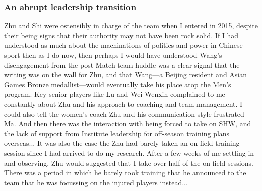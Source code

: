 \begin{CJK}{UTF8}{gbsn}



  \subsubsection{An abrupt leadership transition}
  Zhu and Shi were ostensibly in charge of the team when I entered in 2015, despite their being signs that their authority may not have been rock solid.  If I had understood as much about the machinations of politics and power in Chinese sport then as I do now, then perhaps I would have understood Wang's disengagement from the post-Match team huddle was a clear signal that the writing was on the wall for Zhu, and that Wang---a Beijing resident and Asian Games Bronze medallist---would eventually take his place atop the Men's program.  Key senior players like Lu and Wei Wenxin complained to me constantly about Zhu and his approach to coaching and team management.  I could also tell the women's coach Zhu and his communication style frustrated Ma.  And then there was the interaction with being forced to take on SHW, and the lack of support from Institute leadership for off-season training plans overseas... It was also the case the Zhu had barely taken an on-field training session since I had arrived to do my research.  After a few weeks of me settling in and observing, Zhu would suggested that I take over half of the on field sessions.  There was a period in which he barely took training that he announced to the team that he was focussing on the injured players instead...


\end{CJK}
